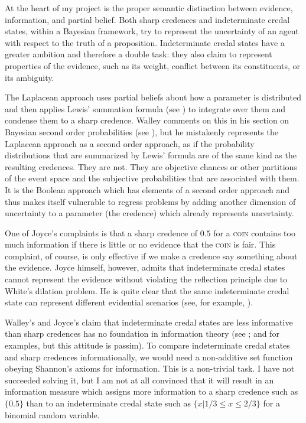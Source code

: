 \documentclass[11pt]{article}
\begin{document}
At the heart of my project is the proper semantic distinction between
evidence, information, and partial belief. Both sharp credences and
indeterminate credal states, within a Bayesian framework, try to
represent the uncertainty of an agent with respect to the truth of a
proposition. Indeterminate credal states have a greater ambition and
therefore a double task: they also claim to represent properties of
the evidence, such as its weight, conflict between its constituents,
or its ambiguity.

The Laplacean approach uses partial beliefs about how a parameter is
distributed and then applies Lewis' summation formula (see
) to integrate over them and condense them to
a sharp credence. Walley comments on this  in his
section on Bayesian second order probabilities (see
), but he mistakenly represents the Laplacean
approach as a second order approach, as if the probability
distributions that are summarized by Lewis' formula are of the same
kind as the resulting credences. They are not. They are objective
chances or other partitions of the event space and the subjective
probabilities that are associated with them. It is the Boolean
approach which has elements of a second order approach and thus makes
itself vulnerable to regress problems by adding another dimension of
uncertainty to a parameter (the credence) which already represents
uncertainty.

One of Joyce's complaints is that a sharp credence of $0.5$ for a
\textsc{coin} contains too much information if there is little or no
evidence that the \textsc{coin} is fair. This complaint, of course, is
only effective if we make a credence say something about the evidence.
Joyce himself, however, admits that indeterminate credal states cannot
represent the evidence without violating the reflection principle due
to White's dilation problem. He is quite clear that the same
indeterminate credal state can represent different evidential
scenarios (see, for example, ).

Walley's and Joyce's claim that indeterminate credal states are less
informative than sharp credences has no foundation in information
theory (see ; and  for
examples, but this attitude is passim). To compare indeterminate
credal states and sharp credences informationally, we would need a
non-additive set function obeying Shannon's axioms for information.
This is a non-trivial task. I have not succeeded solving it, but I am
not at all convinced that it will result in an information measure
which assigns more information to a sharp credence such as $\{0.5\}$
than to an indeterminate credal state such as
$\{x|1/3\leq{}x\leq{}2/3\}$ for a binomial random variable.
\end{document}

